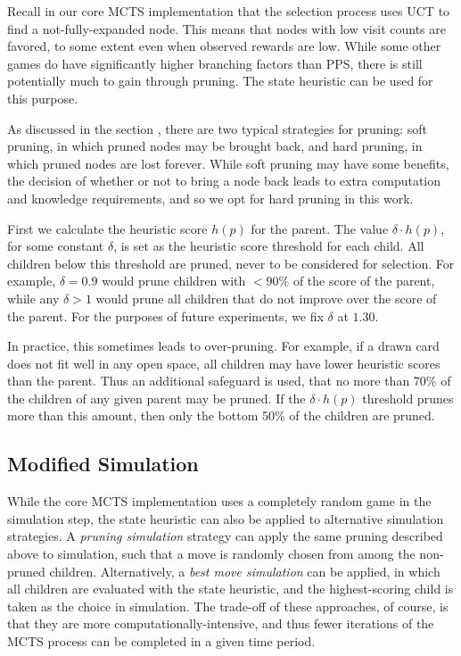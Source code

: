\documentclass[letterpaper]{article}
\begin{document}
Recall in our core MCTS implementation that the selection process uses UCT to find a not-fully-expanded node. This means that nodes with low visit counts are favored, to some extent even when observed rewards are low. While some other games do have significantly higher branching factors than PPS, there is still potentially much to gain through pruning. The state heuristic can be used for this purpose.

As discussed in the section {\it {}}, there are two typical strategies for pruning: soft pruning, in which pruned nodes may be brought back, and hard pruning, in which pruned nodes are lost forever. While soft pruning may have some benefits, the decision of whether or not to bring a node back leads to extra computation and knowledge requirements, and so we opt for hard pruning in this work.

First we calculate the heuristic score $h(p)$ for the parent. The value $\delta \cdot h(p)$, for some constant $\delta$, is set as the heuristic score threshold for each child. All children below this threshold are pruned, never to be considered for selection. For example, $\delta = 0.9$ would prune children with $ < 90\%$ of the score of the parent, while any $\delta > 1$ would prune all children that do not improve over the score of the parent. For the purposes of future experiments, we fix $\delta$ at $1.30$.

In practice, this sometimes leads to over-pruning. For example, if a drawn card does not fit well in any open space, all children may have lower heuristic scores than the parent. Thus an additional safeguard is used, that no more than 70\% of the children of any given parent may be pruned. If the  $\delta \cdot h(p)$ threshold prunes more than this amount, then only the bottom 50\% of the children are pruned.

\subsection{Modified Simulation}

While the core MCTS implementation uses a completely random game in the simulation step, the state heuristic can also be applied to alternative simulation strategies. A {\it pruning simulation} strategy can apply the same pruning described above to simulation, such that a move is randomly chosen from among the non-pruned children. Alternatively, a {\it best move simulation} can be applied, in which all children are evaluated with the state heuristic, and the highest-scoring child is taken as the choice in simulation. The trade-off of these approaches, of course, is that they are more computationally-intensive, and thus fewer iterations of the MCTS process can be completed in a given time period. 
\end{document}
